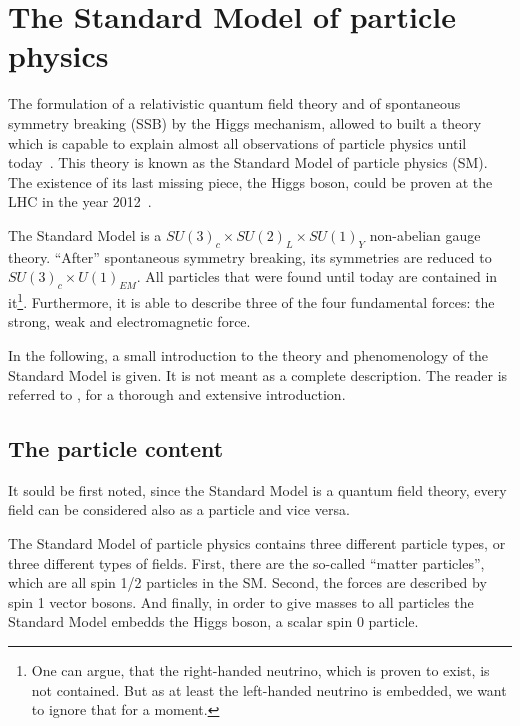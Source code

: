 \chapter{The Standard Model of particle physics}

The formulation of a relativistic quantum field theory and of spontaneous symmetry breaking (SSB) by the Higgs mechanism, allowed to built a theory which is capable to explain almost all observations of particle physics until today~\cite{bib:Theory:GFitter}.
This theory is known as the Standard Model of particle physics (SM).
The existence of its last missing piece, the Higgs boson, could be proven at the LHC in the year 2012~\cite{bib:Theory:CMS:HiggsObservation,bib:Theory:Atlas:HiggsObservation}.

The Standard Model is a $SU(3)_c  \times SU(2)_L \times SU(1)_Y$ non-abelian gauge theory.
``After'' spontaneous symmetry breaking, its symmetries are reduced to $SU(3)_c \times U(1)_{EM}$.
All particles that were found until today are contained in it\footnote{One can argue, that the right-handed neutrino, which is proven to exist, is not contained. But as at least the left-handed neutrino is embedded, we want to ignore that for a moment.}.
Furthermore, it is able to describe three of the four fundamental forces: the strong, weak and electromagnetic force.

In the following, a small introduction to the theory and phenomenology of the Standard Model is given.
It is not meant as a complete description.
The reader is referred to \cite{bib:SM_book_Peskin,bib:SM_book_Ryder,bib:SM_book_Griffiths}, for a thorough and extensive introduction.

\section{The particle content}
It sould be first noted, since the Standard Model is a quantum field theory, every field can be considered also as a particle and vice versa.

The Standard Model of particle physics contains three different particle types, or three different types of fields.
First, there are the so-called ``matter particles'', which are all spin 1/2 particles in the SM.
Second, the forces are described by spin 1 vector bosons.
And finally, in order to give masses to all particles the Standard Model embedds the Higgs boson, a scalar spin 0 particle.

